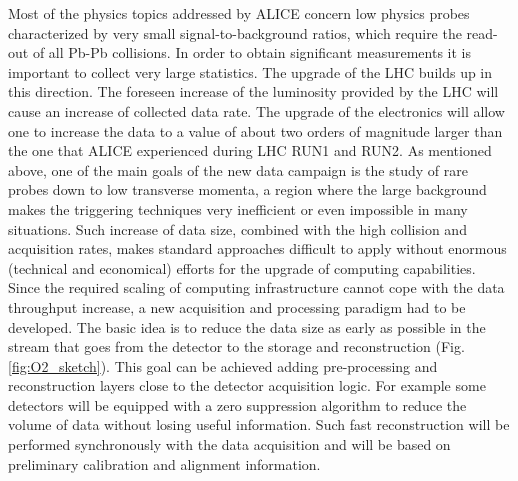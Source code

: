 Most of the physics topics addressed by ALICE concern low \pt physics probes characterized by very small signal-to-background ratios, which require the read-out of all Pb-Pb collisions.
In order to obtain significant measurements it is important to collect very large statistics.
The upgrade of the LHC builds up in this direction.
The foreseen increase of the luminosity provided by the LHC will cause an increase of collected data rate.
The upgrade of the electronics will allow one to increase the data to a value of about two orders of magnitude larger than the one that ALICE experienced during LHC RUN1 and RUN2.
As mentioned above, one of the main goals of the new data campaign is the study of rare probes down to low transverse momenta, a region where the large background makes the triggering techniques very inefficient or even impossible in many situations.
Such increase of data size, combined with the high collision and acquisition rates, makes standard approaches difficult to apply without enormous (technical and economical) efforts for the upgrade of computing capabilities.
Since the required scaling of computing infrastructure cannot cope with the data throughput increase, a new acquisition and processing paradigm had to be developed.
The basic idea is to reduce the data size as early as possible in the stream that goes from the detector to the storage and reconstruction (Fig. \ref{fig:O2_sketch}).
This goal can be achieved adding pre-processing and reconstruction layers close to the detector acquisition logic.
For example some detectors will be equipped with a zero suppression algorithm to reduce the volume of data without losing useful information.
Such fast reconstruction will be performed synchronously with the data acquisition and will be based on preliminary calibration and alignment information.

